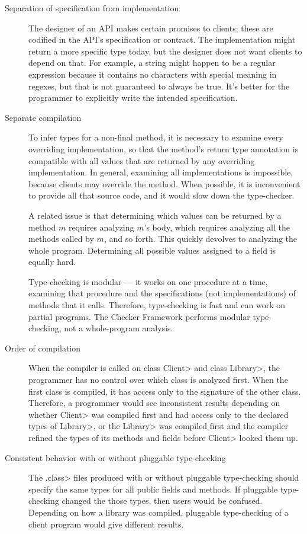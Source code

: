 \begin{description}
\item[Separation of specification from implementation]
  The designer of an API makes certain promises to clients; these are
  codified in the API's specification or contract.  The implementation
  might return a more specific type today, but the designer does not want
  clients to depend on that.  For example, a string might happen to be a
  regular expression because it contains no characters with special meaning
  in regexes, but that is not guaranteed to always be true.  It's better
  for the programmer to explicitly write the intended specification.

\item[Separate compilation]
  To infer types for a non-final method, it is necessary to examine every
  overriding implementation, so that the method's return type annotation is
  compatible with all values that are returned by any overriding
  implementation.  In general, examining all implementations is impossible,
  because clients may override the method.  When possible, it is
  inconvenient to provide all that source code, and it would slow down the
  type-checker.

  A related issue is that determining which values can be returned by a
  method $m$ requires analyzing $m$'s body, which requires analyzing
  all the methods called by $m$, and so forth.  This quickly devolves to
  analyzing the whole program.
  Determining all possible values assigned to a field is equally hard.

  Type-checking is modular --- it works on one procedure at a time,
  examining that procedure and the specifications (not implementations) of
  methods that it calls.  Therefore, type-checking is fast and can work on
  partial programs.  The Checker Framework performs modular type-checking,
  not a whole-program analysis.

\item[Order of compilation]
  When the compiler is called on class \<Client> and class \<Library>, the
  programmer has no control over which class is analyzed first.  When the
  first class is compiled, it has access only to the signature of the other
  class.  Therefore, a programmer would see inconsistent results depending
  on whether \<Client> was compiled first and had access only to the
  declared types of \<Library>, or the \<Library> was compiled first and
  the compiler refined the types of its methods and fields before \<Client>
  looked them up.

\item[Consistent behavior with or without pluggable type-checking]
  The \<.class> files produced with or without pluggable type-checking
  should specify the same types for all public fields and methods.  If
  pluggable type-checking changed the those types, then users would be
  confused.  Depending on how a library was compiled, pluggable
  type-checking of a client program would give different results.

\end{description}

